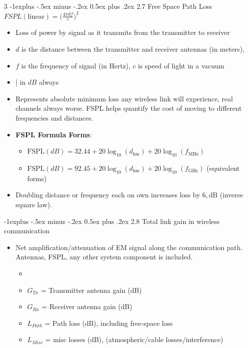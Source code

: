 \documentclass[a4paper, 9pt, landscape]{extarticle}
\makeatletter
\renewcommand{\subsection}{\@startsection{subsection}{2}{0mm}%
                                {-1explus -.5ex minus -.2ex}%
                                {0.5ex plus .2ex}%
                                {\normalfont\normalsize\bfseries}}
\makeatother
\begin{document}
\begin{multicols*}{3}
\subsection{2.7 Free Space Path Loss  $FSPL (\text{linear}) = {(\frac{4\pi d f }{c}})^2$}
\begin{itemize}
  \item Loss of power by signal as it transmits from the transmitter to receiver 
  \item $d$ is the distance between the transmitter and receiver antennas (in meters),
  \item $f$ is the frequency of signal (in Hertz), $c$ is speed of light in a vacuum
  \item {} \tiny{| in $dB$ always}
\end{itemize}

\begin{itemize}
  \item Represents absolute minimum loss any wireless link will experience, real channels always worse. FSPL helps quantify the cost of moving to different frequencies and distances.
  \item \textbf{FSPL Formula Forms}:
  \begin{itemize}
    \item $\text{FSPL}(dB) = 32.44 + 20\log_{10}(d_{\text{km}}) + 20\log_{10}(f_{\text{MHz}})$ 
    \item $\text{FSPL}(dB) = 92.45 + 20\log_{10}(d_{\text{km}}) + 20\log_{10}(f_{\text{GHz}})$ (equivalent forms)
  \end{itemize}
  \item Doubling distance or frequency each on own increases loss by $6,\text{dB}$ (inverse square law).
\end{itemize}

\subsection{2.8 Total link gain in wireless communication}
\begin{itemize}
  \item Net amplification/attenuation of EM signal along the communication path.
  \\ Antennas, FSPL, any other system component is included. 
  \begin{itemize}
    \item {}
      \item $G_{Tx}$ = Transmitter antenna gain (dB)
      \item $G_{Rx}$ = Receiver antenna gain (dB)
      \item $L_{Path}$ = Path loss (dB), including free-space loss
      \item $L_{Misc}$ = misc losses (dB), (atmospheric/cable losses/interference)
  \end{itemize}
\end{itemize}



\end{multicols*}
\end{document}
